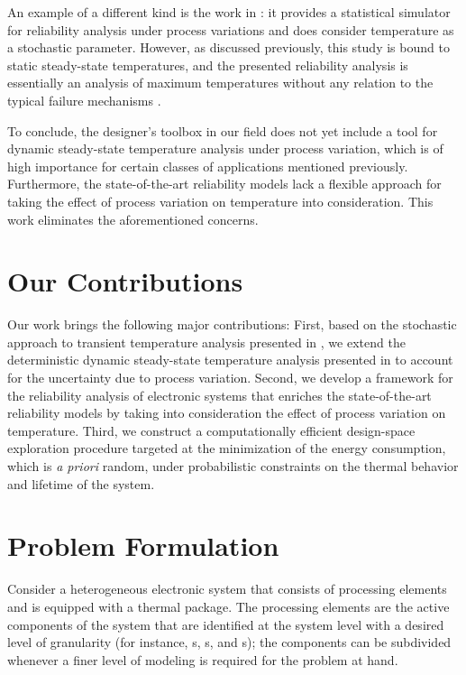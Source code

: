 An example of a different kind is the work in \cite{lee2013}: it provides a
statistical simulator for reliability analysis under process variations and does
consider temperature as a stochastic parameter. However, as discussed
previously, this study is bound to static steady-state temperatures, and the
presented reliability analysis is essentially an analysis of maximum
temperatures without any relation to the typical failure mechanisms
\cite{jedec2016}.

To conclude, the designer's toolbox in our field does not yet include a tool for
dynamic steady-state temperature analysis under process variation, which is of
high importance for certain classes of applications mentioned previously.
Furthermore, the state-of-the-art reliability models lack a flexible approach
for taking the effect of process variation on temperature into consideration.
This work eliminates the aforementioned concerns.

\section{Our Contributions}

Our work brings the following major contributions:
First, based on the stochastic approach to transient temperature analysis
presented in \cite{ukhov2014b}, we extend the deterministic dynamic steady-state
temperature analysis presented in \cite{ukhov2012} to account for the
uncertainty due to process variation. Second, we develop a framework for the
reliability analysis of electronic systems that enriches the state-of-the-art
reliability models by taking into consideration the effect of process variation
on temperature. Third, we construct a computationally efficient design-space
exploration procedure targeted at the minimization of the energy consumption,
which is \emph{a priori} random, under probabilistic constraints on the thermal
behavior and lifetime of the system.

\section{Problem Formulation}

Consider a heterogeneous electronic system that consists of \np processing
elements and is equipped with a thermal package. The processing elements are the
active components of the system that are identified at the system level with a
desired level of granularity (for instance, s, s, and
s); the components can be subdivided whenever a finer level of modeling
is required for the problem at hand.

